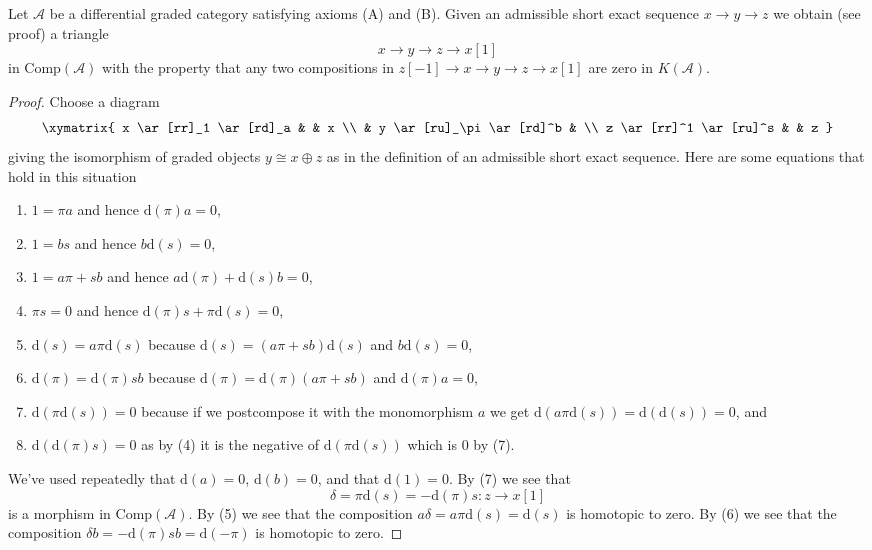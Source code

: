 \begin{lemma}
\label{lemma-get-triangle}
Let $\mathcal{A}$ be a differential graded category satisfying
axioms (A) and (B). Given an admissible short exact sequence
$x \to y \to z$ we obtain (see proof) a triangle
$$
x \to y \to z \to x[1]
$$
in $\text{Comp}(\mathcal{A})$ with the property that any two compositions
in $z[-1] \to x \to y \to z \to x[1]$ are zero in $K(\mathcal{A})$.
\end{lemma}

\begin{proof}
Choose a diagram
$$
\xymatrix{
x \ar[rr]_1 \ar[rd]_a & & x \\
& y \ar[ru]_\pi \ar[rd]^b & \\
z \ar[rr]^1 \ar[ru]^s & & z
}
$$
giving the isomorphism of graded objects $y \cong x \oplus z$ as in the
definition of an admissible short exact sequence. Here are some equations
that hold in this situation
\begin{enumerate}
\item $1 = \pi a$ and hence $\text{d}(\pi) a = 0$,
\item $1 = b s$ and hence $b \text{d}(s) = 0$,
\item $1 = a \pi + s b$ and hence $a \text{d}(\pi) + \text{d}(s) b = 0$,
\item $\pi s = 0$ and hence $\text{d}(\pi)s + \pi \text{d}(s) = 0$,
\item $\text{d}(s) = a \pi \text{d}(s)$ because
$\text{d}(s) = (a \pi + s b)\text{d}(s)$ and $b\text{d}(s) = 0$,
\item $\text{d}(\pi) = \text{d}(\pi) s b$ because
$\text{d}(\pi) = \text{d}(\pi)(a \pi + s b)$ and $\text{d}(\pi)a = 0$,
\item $\text{d}(\pi \text{d}(s)) = 0$ because if we postcompose it
with the monomorphism $a$ we get
$\text{d}(a\pi \text{d}(s)) = \text{d}(\text{d}(s)) = 0$, and
\item $\text{d}(\text{d}(\pi)s) = 0$ as by (4) it is the negative
of $\text{d}(\pi\text{d}(s))$ which is $0$ by (7).
\end{enumerate}
We've used repeatedly that $\text{d}(a) = 0$, $\text{d}(b) = 0$,
and that $\text{d}(1) = 0$. By (7) we see that
$$
\delta = \pi \text{d}(s) = - \text{d}(\pi) s : z \to x[1]
$$
is a morphism in $\text{Comp}(\mathcal{A})$. By (5) we see that
the composition $a \delta = a \pi \text{d}(s) = \text{d}(s)$
is homotopic to zero. By (6) we see that the composition
$\delta b = - \text{d}(\pi)sb = \text{d}(-\pi)$ is homotopic to zero.
\end{proof}

